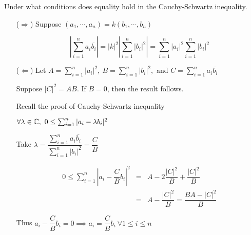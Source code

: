 Under what conditions does equality hold in the Cauchy-Schwartz inequality.

\begin{tcolorbox}
	\begin{solution}
		\begin{enumerate}
			\item[($\Rightarrow$)]
				Suppose $(a_1,\cdots,a_n) = k(b_1,\cdots,b_n)$
				
				$$|\sum^n_{i=1}a_i\overline{b_i}| = |k|^2 \left|\sum^n_{i=1}|b_i|^2\right| = \sum^n_{i=1}|a_i|^2 \sum^n_{i=1}|b_i|^2$$
			\item[($\Leftarrow$)]
			Let $A = \sum_{i=1}^n|a_i|^2,~B = \sum^n_{i=1}|b_i|^2,$ and $C = \sum_{i=1}^{n}a_i\overline{b_i}$
			
			Suppose $|C|^2 = AB$. If $B = 0$, then the result follows.
			
			Recall the proof of Cauchy-Schwartz inequality
			
			$\forall \lambda \in \mathbb{C},~0 \leq \sum^n_{i=1}|a_i - \lambda b_i|^2$
			
			Take $\lambda = \dfrac{\sum_{i=1}^n a_i\overline{b_i}}{\sum_{i=1}^n |b_i|^2} = \dfrac{C}{B}$
			
			\begin{eqnarray*}
				0 \leq \sum^n_{i=1}|a_i - \dfrac{C}{B}b_i|^2 &=& A - 2 \dfrac{|C|^2}{B} + \dfrac{|C|^2}{B}\\
				&=& A - \dfrac{|C|^2}{B} = \dfrac{BA - |C|^2}{B}
			\end{eqnarray*} 
			
			Thus $a_i - \dfrac{C}{B}b_i = 0 \implies a_i = \dfrac{C}{B}b_i ~\forall 1 \leq i \leq n$
		\end{enumerate}
	\end{solution}
\end{tcolorbox}







